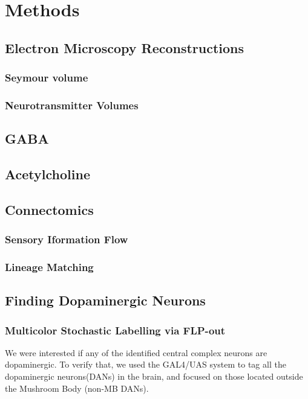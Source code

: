 
\chapter{Methods}



\section{Electron Microscopy Reconstructions}
\subsection{Seymour volume}
\subsection{Neurotransmitter Volumes}
\section*{GABA}
\section*{Acetylcholine}

\section{Connectomics}
\subsection{Sensory Iformation Flow}
\subsection{Lineage Matching}


\section{Finding Dopaminergic Neurons}
\subsection{Multicolor Stochastic Labelling via FLP-out} 
We were interested if any of the identified central complex neurons are dopaminergic. To verify that, we used the GAL4/UAS system to tag all the dopaminergic neurons(DANs) in the brain, and focused on those located outside the Mushroom Body (non-MB DANs).



